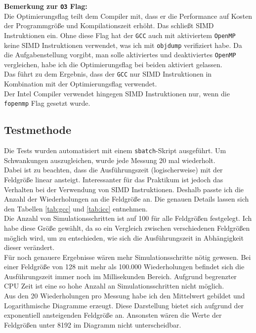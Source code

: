 \documentclass[german,plainarticle,hyperref,utf8]{zihpub}
\begin{document}
	\textbf{Bemerkung zur \texttt{O3} Flag:}\\
	Die Optimierungsflag teilt dem Compiler mit, dass er die Performance auf Kosten der Programmgröße und Kompilationszeit erhöht. Das schließt SIMD Instruktionen ein. Ohne diese Flag hat der \texttt{GCC} auch mit aktiviertem \texttt{OpenMP} keine SIMD Instruktionen verwendet, was ich mit \texttt{objdump} verifiziert habe. Da die Aufgabenstellung vorgibt, man solle aktiviertes und deaktiviertes \texttt{OpenMP} vergleichen, habe ich die Optimierungsflag bei beiden aktiviert gelassen.\\
	Das führt zu dem Ergebnis, dass der \texttt{GCC} nur SIMD Instruktionen in Kombination mit der Optimierungsflag verwendet.\\
	Der Intel Compiler verwendet hingegen SIMD Instruktionen nur, wenn die \texttt{fopenmp} Flag gesetzt wurde.
	
	\subsection{Testmethode}
	Die Tests wurden automatisiert mit einem \texttt{sbatch}-Skript ausgeführt. Um Schwankungen auszugleichen, wurde jede Messung 20 mal wiederholt.\\
	Dabei ist zu beachten, dass die Ausführungszeit (logischerweise) mit der Feldgröße linear ansteigt. Interessanter für das Praktikum ist jedoch das Verhalten bei der Verwendung von SIMD Instruktionen. Deshalb passte ich die Anzahl der Wiederholungen an die Feldgröße an. Die genauen Details lassen sich den Tabellen \ref{tab:gcc} und
	\ref{tab:icc} entnehmen.\\
	Die Anzahl von Simulationsschritten ist auf 100 für alle Feldgrößen festgelegt. Ich habe diese Größe gewählt, da so ein Vergleich zwischen verschiedenen Feldgrößen möglich wird, um zu entschieden, wie sich die Ausführungszeit in Abhängigkeit dieser verändert.\\
	Für noch genauere Ergebnisse wären mehr Simulationsschritte nötig gewesen. Bei einer Feldgröße von 128 mit mehr als 100.000 Wiederholungen befindet sich die Ausführungszeit immer noch im Millisekunden Bereich. Aufgrund begrenzter CPU Zeit ist eine so hohe Anzahl an Simulationsschritten nicht möglich.\\
	
	Aus den 20 Wiederholungen pro Messung habe ich den Mittelwert gebildet und Logarithmische Diagramme erzeugt. Diese Darstellung bietet sich aufgrund der exponentiell ansteigenden Feldgröße an. Ansonsten wären die Werte der Feldgrößen unter 8192 im Diagramm nicht unterscheidbar.
	\newpage
\end{document}
